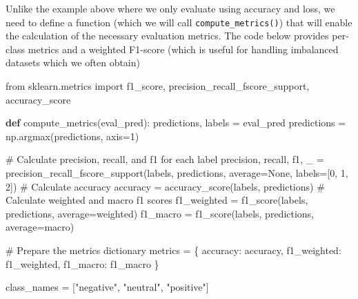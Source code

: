 \documentclass[
  letterpaper,
  DIV=11,
  numbers=noendperiod]{scrreprt}
\newenvironment{Shaded}{\begin{snugshade}}{\end{snugshade}}
\newcommand{\CommentTok}[1]{\textcolor[rgb]{0.37,0.37,0.37}{#1}}
\newcommand{\DecValTok}[1]{\textcolor[rgb]{0.68,0.00,0.00}{#1}}
\newcommand{\ImportTok}[1]{\textcolor[rgb]{0.00,0.46,0.62}{#1}}
\newcommand{\KeywordTok}[1]{\textcolor[rgb]{0.00,0.23,0.31}{\textbf{#1}}}
\newcommand{\NormalTok}[1]{\textcolor[rgb]{0.00,0.23,0.31}{#1}}
\newcommand{\OperatorTok}[1]{\textcolor[rgb]{0.37,0.37,0.37}{#1}}
\newcommand{\StringTok}[1]{\textcolor[rgb]{0.13,0.47,0.30}{#1}}
\newcommand{\VariableTok}[1]{\textcolor[rgb]{0.07,0.07,0.07}{#1}}
\begin{document}
Unlike the example above where we only evaluate using accuracy and loss,
we need to define a function (which we will call
\texttt{compute\_metrics()}) that will enable the calculation of the
necessary evaluation metrics. The code below provides per-class metrics
and a weighted F1-score (which is useful for handling imbalanced
datasets which we often obtain)

\begin{Shaded}
\begin{Highlighting}[]
\ImportTok{from}\NormalTok{ sklearn.metrics }\ImportTok{import}\NormalTok{ f1\_score, precision\_recall\_fscore\_support, accuracy\_score}

\KeywordTok{def}\NormalTok{ compute\_metrics(eval\_pred):}
\NormalTok{    predictions, labels }\OperatorTok{=}\NormalTok{ eval\_pred}
\NormalTok{    predictions }\OperatorTok{=}\NormalTok{ np.argmax(predictions, axis}\OperatorTok{=}\DecValTok{1}\NormalTok{)}

    \CommentTok{\# Calculate precision, recall, and f1 for each label}
\NormalTok{    precision, recall, f1, \_ }\OperatorTok{=}\NormalTok{ precision\_recall\_fscore\_support(labels, predictions, average}\OperatorTok{=}\VariableTok{None}\NormalTok{, labels}\OperatorTok{=}\NormalTok{[}\DecValTok{0}\NormalTok{, }\DecValTok{1}\NormalTok{, }\DecValTok{2}\NormalTok{])}
    \CommentTok{\# Calculate accuracy}
\NormalTok{    accuracy }\OperatorTok{=}\NormalTok{ accuracy\_score(labels, predictions)}
    \CommentTok{\# Calculate weighted and macro f1 scores}
\NormalTok{    f1\_weighted }\OperatorTok{=}\NormalTok{ f1\_score(labels, predictions, average}\OperatorTok{=}\StringTok{\textquotesingle{}weighted\textquotesingle{}}\NormalTok{)}
\NormalTok{    f1\_macro }\OperatorTok{=}\NormalTok{ f1\_score(labels, predictions, average}\OperatorTok{=}\StringTok{\textquotesingle{}macro\textquotesingle{}}\NormalTok{)}

    \CommentTok{\# Prepare the metrics dictionary}
\NormalTok{    metrics }\OperatorTok{=}\NormalTok{ \{}
        \StringTok{\textquotesingle{}accuracy\textquotesingle{}}\NormalTok{: accuracy,}
        \StringTok{\textquotesingle{}f1\_weighted\textquotesingle{}}\NormalTok{: f1\_weighted,}
        \StringTok{\textquotesingle{}f1\_macro\textquotesingle{}}\NormalTok{: f1\_macro}
\NormalTok{    \}}

\NormalTok{    class\_names }\OperatorTok{=}\NormalTok{ [}\StringTok{"negative"}\NormalTok{, }\StringTok{"neutral"}\NormalTok{, }\StringTok{"positive"}\NormalTok{]}
    

\end{Highlighting}
\end{Shaded}
\end{document}
